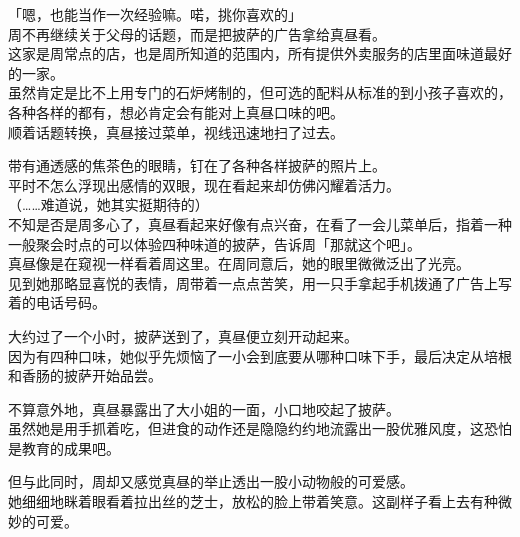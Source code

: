 「嗯，也能当作一次经验嘛。喏，挑你喜欢的」\\

周不再继续关于父母的话题，而是把披萨的广告拿给真昼看。\\

这家是周常点的店，也是周所知道的范围内，所有提供外卖服务的店里面味道最好的一家。\\

虽然肯定是比不上用专门的石炉烤制的，但可选的配料从标准的到小孩子喜欢的，各种各样的都有，想必肯定会有能对上真昼口味的吧。\\

顺着话题转换，真昼接过菜单，视线迅速地扫了过去。

带有通透感的焦茶色的眼睛，钉在了各种各样披萨的照片上。\\

平时不怎么浮现出感情的双眼，现在看起来却仿佛闪耀着活力。\\

（……难道说，她其实挺期待的）\\

不知是否是周多心了，真昼看起来好像有点兴奋，在看了一会儿菜单后，指着一种一般聚会时点的可以体验四种味道的披萨，告诉周「那就这个吧」。\\

真昼像是在窥视一样看着周这里。在周同意后，她的眼里微微泛出了光亮。\\

见到她那略显喜悦的表情，周带着一点点苦笑，用一只手拿起手机拨通了广告上写着的电话号码。\\

\vspace{2\baselineskip}

大约过了一个小时，披萨送到了，真昼便立刻开动起来。\\

因为有四种口味，她似乎先烦恼了一小会到底要从哪种口味下手，最后决定从培根和香肠的披萨开始品尝。

不算意外地，真昼暴露出了大小姐的一面，小口地咬起了披萨。\\

虽然她是用手抓着吃，但进食的动作还是隐隐约约地流露出一股优雅风度，这恐怕是教育的成果吧。

但与此同时，周却又感觉真昼的举止透出一股小动物般的可爱感。\\

她细细地眯着眼看着拉出丝的芝士，放松的脸上带着笑意。这副样子看上去有种微妙的可爱。\\

